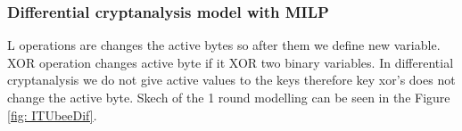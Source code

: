 \documentclass{beamer}
\begin{document}
\begin{frame}
\frametitle{Differential cryptanalysis model with MILP}
   L operations are changes the active bytes so after them we define new variable. XOR operation changes active byte if it XOR two binary variables. In differential cryptanalysis we do not give active values to the keys therefore key xor's does not change the active byte. Skech of the 1 round modelling can be seen in the Figure \ref{fig: ITUbeeDif}. 

\begin{figure}[!ht]
\footnotesize
\centering
{}%

\label{fig:my_label}
\end{figure}

\end{frame}
\end{document}
